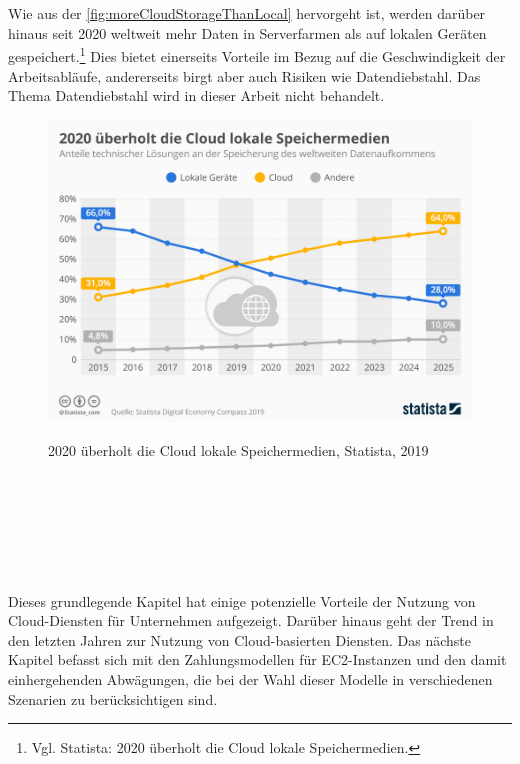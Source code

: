 \\\\
Wie aus der \autoref{fig:moreCloudStorageThanLocal} hervorgeht ist, werden darüber hinaus seit 2020 weltweit mehr Daten in Serverfarmen als auf lokalen Geräten gespeichert.\footnote{Vgl. Statista: 2020 überholt die Cloud lokale Speichermedien.\cite{STA1}} Dies bietet einerseits  Vorteile im Bezug auf die Geschwindigkeit der Arbeitsabläufe, andererseits birgt aber auch Risiken wie Datendiebstahl. Das Thema Datendiebstahl wird in dieser Arbeit nicht behandelt.%
\begin{figure}[h!]
      \centering
      \includegraphics[scale=0.4]{sources/moreCloudStorageThanLocal}
      \caption[2020 überholt die Cloud lokale Speichermedien]{}\label{fig:moreCloudStorageThanLocal}
      2020 überholt die Cloud lokale Speichermedien, Statista, 2019 {\cite{STA1}}
\end{figure}
\\\\
\\\\
\\\\
Dieses grundlegende Kapitel hat einige potenzielle Vorteile der Nutzung von Cloud-Diensten für Unternehmen aufgezeigt. Darüber hinaus geht der Trend in den letzten Jahren zur Nutzung von Cloud-basierten Diensten. Das nächste Kapitel befasst sich mit den Zahlungsmodellen für EC2-Instanzen und den damit einhergehenden Abwägungen, die bei der Wahl dieser Modelle in verschiedenen Szenarien zu berücksichtigen sind.
\newpage

